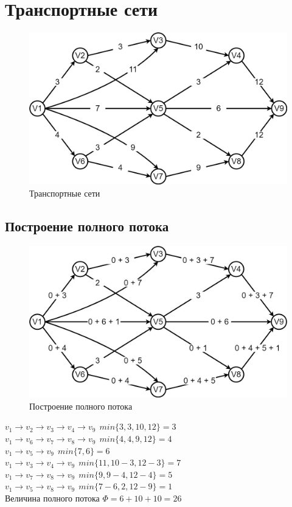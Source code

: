 \section{Транспортные сети}
\begin{figure}[!htb]
\centering
\includegraphics[width=\linewidth]{Images/graph13.jpg}
\caption{Транспортные сети}
\label{fig:image7}
\end{figure}
\subsection{Построение полного потока}
\begin{figure}[!htb]
\centering
\includegraphics[width=\linewidth]{Images/graph14.jpg}
\caption{Построение полного потока}
\label{fig:image8}
\end{figure}
\noindent$v_1 \to v_2 \to v_3 \to v_4 \to v_9 \
\ min\{3,3,10,12 \}=3$ \\
$v_1 \to v_6 \to v_7 \to v_8 \to v_9 \
\ min\{4,4,9,12 \}=4$ \\
$v_1 \to v_5 \to v_9 \
\ min\{7,6 \}=6$ \\
$v_1 \to v_3 \to v_4 \to v_9 \
\ min\{11,10-3,12-3 \}=7$ \\
$v_1 \to v_7 \to v_8 \to v_9 \
\ min\{9,9-4,12-4 \}=5$ \\
$v_1 \to v_5 \to v_8 \to v_9 \
\ min\{7-6,2,12-9 \}=1$ \\
Величина полного потока $\Phi = 6 + 10 + 10 = 26$
\newpage
